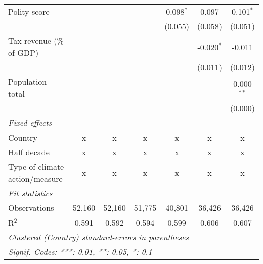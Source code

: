 \begin{tabular}{lcccccc}
   Polity score                                                               &         &                &                & 0.098$^{*}$   & 0.097         & 0.101$^{*}$\\   
                                                                              &         &                &                & (0.055)       & (0.058)       & (0.051)\\   
   Tax revenue (\% of GDP)                                                    &         &                &                &               & -0.020$^{*}$  & -0.011\\   
                                                                              &         &                &                &               & (0.011)       & (0.012)\\   
   Population total                                                           &         &                &                &               &               & 0.000$^{**}$\\   
                                                                              &         &                &                &               &               & (0.000)\\   
   \emph{Fixed effects}\\
   Country                                                                    & x       & x              & x              & x             & x             & x\\  
   Half decade                                                                & x       & x              & x              & x             & x             & x\\  
   Type of climate action/measure                                             & x       & x              & x              & x             & x             & x\\  
   \midrule \emph{Fit statistics}\\
   Observations                                                               & 52,160  & 52,160         & 51,775         & 40,801        & 36,426        & 36,426\\  
   R$^2$                                                                      & 0.591   & 0.592          & 0.594          & 0.599         & 0.606         & 0.607\\  
   \midrule
   \multicolumn{7}{l}{\emph{Clustered (Country) standard-errors in parentheses}}\\
   \multicolumn{7}{l}{\emph{Signif. Codes: ***: 0.01, **: 0.05, *: 0.1}}\\
\end{tabular}
\par\endgroup


